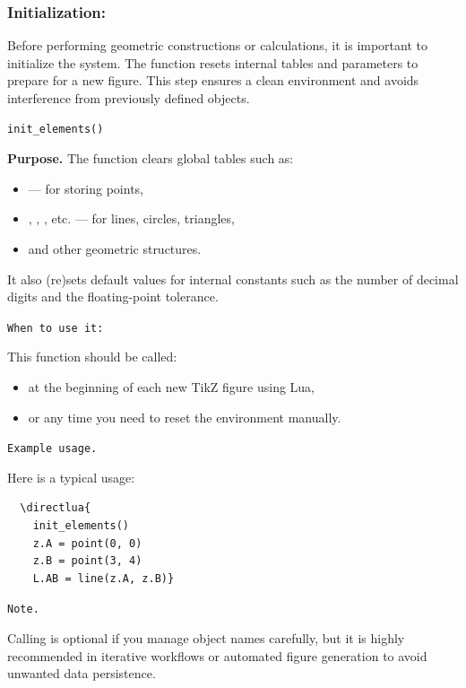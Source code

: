 \subsubsection{Initialization: }

Before performing geometric constructions or calculations, it is important to initialize the system. The function  resets internal tables and parameters to prepare for a new figure. This step ensures a clean environment and avoids interference from previously defined objects.

\begin{mybox}
\begin{verbatim}
init_elements()
\end{verbatim}
\end{mybox}

\textbf{Purpose.}
The function  clears global tables such as:
\begin{itemize}
  \item {} — for storing points,
  \item {}, , , etc. — for lines, circles, triangles,
  \item and other geometric structures.
\end{itemize}
It also (re)sets default values for internal constants such as the number of decimal digits and the floating-point tolerance.

\medskip
\texttt{When to use it:}

This function should be called:
\begin{itemize}
  \item at the beginning of each new TikZ figure using Lua,
  \item or any time you need to reset the environment manually.
\end{itemize}

\medskip
\texttt{Example usage.}

Here is a typical usage:

  \begin{verbatim}
  \directlua{
    init_elements()
    z.A = point(0, 0)
    z.B = point(3, 4)
    L.AB = line(z.A, z.B)}
  \end{verbatim}


\medskip
\texttt{Note.}

Calling  is optional if you manage object names carefully, but it is highly recommended in iterative workflows or automated figure generation to avoid unwanted data persistence.

